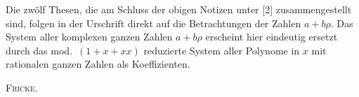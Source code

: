 Die zwölf Thesen, die am Schluss der obigen Notizen unter [2] zusammengestellt
sind, folgen in der Urschrift direkt auf die Betrachtungen der Zahlen $a+b\rho$.
Das System aller komplexen ganzen Zahlen $a+b\rho$ erscheint hier eindeutig ersetzt
durch das mod.\ $(1+x+xx)$ reduzierte System aller Polynome in $x$ mit rationalen ganzen Zahlen
als Koeffizienten.
\par\nobreak\noindent\hfill\textsc{Fricke}.\par
\endgroup
